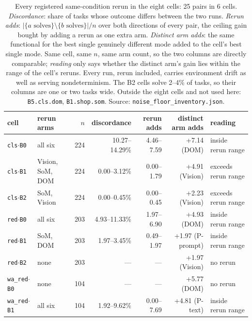 \begin{table}[t]
\centering\footnotesize
\setlength{\tabcolsep}{3.5pt}
\begin{tabular}{@{}llrrrrl@{}}
\toprule
cell & rerun arms & $n$ & discordance & rerun adds & distinct arm adds & reading \\
\midrule
\texttt{cls$\cdot$B0} & all six & 224 & 10.27--14.29\% & 4.46--7.59 & +7.14 (DOM) & inside rerun range \\
\texttt{cls$\cdot$B1} & Vision, SoM, DOM & 224 & 0.00--3.12\% & 0.00--1.79 & +4.91 (Vision) & exceeds rerun range \\
\texttt{cls$\cdot$B2} & SoM, Vision & 224 & 0.00--0.45\% & 0.00--0.45 & +2.23 (Vision) & exceeds rerun range \\
\texttt{red$\cdot$B0} & all six & 203 & 4.93--11.33\% & 1.97--6.90 & +4.93 (DOM) & inside rerun range \\
\texttt{red$\cdot$B1} & SoM, DOM & 203 & 1.97--3.45\% & 0.49--1.97 & +1.97 (P-prompt) & inside rerun range \\
\texttt{red$\cdot$B2} & none & 203 & --- & --- & +1.97 (Vision) & no rerun \\
\texttt{wa\_red$\cdot$B0} & none & 104 & --- & --- & +5.77 (DOM) & no rerun \\
\texttt{wa\_red$\cdot$B1} & all six & 104 & 1.92--9.62\% & 0.00--7.69 & +4.81 (P-text) & inside rerun range \\
\bottomrule
\end{tabular}
\caption{Every registered same-condition rerun in the eight cells: 25 pairs in 6 cells. \emph{Discordance}: share of tasks whose outcome differs between the two runs. \emph{Rerun adds}: $|\{a \text{ solves}\} \setminus \{b \text{ solves}\}|/n$ over both directions of every pair, the ceiling gain bought by adding a rerun as one extra arm. \emph{Distinct arm adds}: the same functional for the best single genuinely different mode added to the cell's best single mode. Same cell, same $n$, same arm count, so the two columns are directly comparable; \emph{reading} only says whether the distinct arm's gain lies within the range of the cell's reruns. Every run, rerun included, carries environment drift as well as serving nondeterminism. The B2 cells solve 2--4\% of tasks, so their columns are one or two tasks wide. Outside the eight cells and not used here: \texttt{B5.cls.dom}, \texttt{B1.shop.som}. Source: \texttt{noise\_floor\_inventory.json}.}
\label{tab:rerun}
\end{table}
